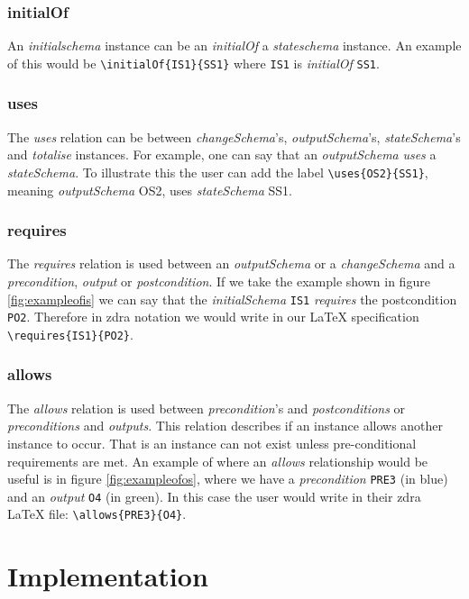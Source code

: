 \subsubsection{initialOf}

An \emph{initialschema} instance can be an \emph{initialOf} a \emph{stateschema} instance. An example of this would be \verb|\initialOf{IS1}{SS1}| where \verb|IS1| is \emph{initialOf} \verb|SS1|.

\subsubsection{uses}
The \emph{uses} relation can be between \emph{changeSchema}'s, \emph{outputSchema}'s, \emph{stateSchema}'s and \emph{totalise} instances. For example, one can say that an \emph{outputSchema} \emph{uses} a \emph{stateSchema}. To illustrate this the user can add the label \verb|\uses{OS2}{SS1}|, meaning \emph{outputSchema} OS2, uses \emph{stateSchema} SS1.

\subsubsection{requires}
The \emph{requires} relation is used between an \emph{outputSchema} or a \emph{changeSchema} and a \emph{precondition}, \emph{output} or \emph{postcondition}. If we take the example shown in figure \ref{fig:exampleofis} we can say that the \emph{initialSchema} \verb|IS1| \emph{requires} the postcondition \verb|PO2|. Therefore in \gls{zdra} notation we would write in our \LaTeX{} specification \verb|\requires{IS1}{PO2}|.

\subsubsection{allows}
The \emph{allows} relation is used between \emph{precondition}'s and \emph{postconditions} or \emph{preconditions} and \emph{outputs}. This relation describes if an instance allows another instance to occur. That is an instance can not exist unless pre-conditional requirements are met. An example of where an \emph{allows} relationship would be useful is in figure \ref{fig:exampleofos}, where we have a \emph{precondition} \verb|PRE3| (in blue) and an \emph{output} \verb|O4| (in green). In this case the user would write in their \gls{zdra} \LaTeX{} file: \verb|\allows{PRE3}{O4}|.


\section{Implementation}
\label{sec:zdra_implement}

